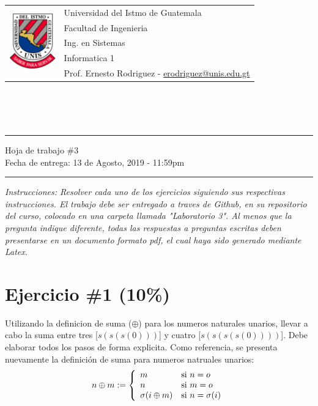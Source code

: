 \documentclass{article}
\newcommand{\horrule}[1]{\rule{\linewidth}{#1}}
\begin{document}
\begin{tabular}{l l}
\multirow{5}{*}{\includegraphics[width=2cm]{../../recursos/logo.png}}
 & Universidad del Istmo de Guatemala \\
 & Facultad de Ingenieria \\
 & Ing. en Sistemas \\
 & Informatica 1 \\
 & Prof. Ernesto Rodriguez - \href{mailto:erodriguez@unis.edu.gt}{erodriguez@unis.edu.gt} \\
\end{tabular}
\\\\\\

\begin{center}
        \horrule{0.5pt}
        \huge{Hoja de trabajo \#3} \\
        \large{Fecha de entrega: 13 de Agosto, 2019 - 11:59pm} \\
        \horrule{1pt}
\end{center}

\emph{Instrucciones: Resolver cada uno de los ejercicios siguiendo sus respectivas
instrucciones. El trabajo debe ser entregado a traves de Github, en su repositorio del curso, colocado en una carpeta llamada "Laboratorio 3".
Al menos que la pregunta indique diferente, todas las respuestas a preguntas escritas deben presentarse en
un documento formato pdf, el cual haya sido generado mediante Latex. }

\section*{Ejercicio \#1 (10\%)}
Utilizando la definicion de suma ($\oplus$) para los numeros naturales unarios, llevar
a cabo la suma entre tres [$s(s(s(0)))$] y cuatro [$s(s(s(s(0))))$]. Debe elaborar todos
los pasos de forma explicita. Como referencia, se presenta nuevamente la definici\'on de
suma para numeros natruales unarios:
\[
        n\oplus m := \left\{
        \begin{array}{l l}
            m & \mbox{si } n=o \\
            n & \mbox{si } m=o \\
            \sigma(i\oplus m) & \mbox{si } n=\sigma(i) \\
        \end{array}
        \right.
    \]
\end{document}
